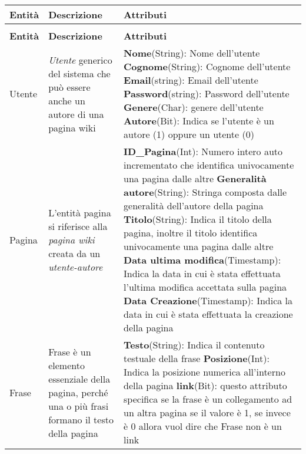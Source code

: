
\begin{longtable}{|p{2.5cm}|p{6cm}|L|}

\hline
\textbf{Entità} & \textbf{Descrizione} & \textbf{Attributi} \\
\hline

\endfirsthead
{} \\
\hline
\textbf{Entità} & \textbf{Descrizione} & \textbf{Attributi} \\
\hline
\endhead

Utente & 
\textit{Utente} generico del sistema che può 
essere anche un autore di una pagina wiki &
\textbf{Nome}(String): Nome dell'utente \newline
\textbf{Cognome}(String): Cognome dell'utente \newline
\textbf{Email}(string): Email dell'utente \newline
\textbf{Password}(string): Password dell'utente \newline
\textbf{Genere}(Char): genere dell'utente \newline
\textbf{Autore}(Bit): Indica se l'utente è un autore (1) oppure un utente (0)\\

\hline
Pagina & L'entità pagina si riferisce alla \textit{pagina wiki} creata da un \textit{utente-autore} &
\textbf{ID\_Pagina}(Int): Numero intero auto incrementato che identifica univocamente una pagina dalle altre \newline
\textbf{Generalità autore}(String): Stringa composta dalle generalità  dell'autore della pagina \newline
\textbf{Titolo}(String): Indica il titolo della pagina, inoltre il titolo identifica univocamente una pagina dalle altre \newline
\textbf{Data ultima modifica}(Timestamp): Indica la data in cui è stata effettuata l'ultima modifica accettata sulla pagina 
\textbf{Data Creazione}(Timestamp): Indica la data in cui è stata effettuata la creazione della pagina\\

\hline
Frase & Frase è un elemento essenziale della pagina, perché una o più frasi
formano il testo della pagina &
\textbf{Testo}(String): Indica il contenuto testuale della frase \newline
\textbf{Posizione}(Int): Indica la posizione numerica all'interno della pagina \newline
\textbf{link}(Bit): questo attributo specifica se la frase è un collegamento ad un altra pagina se il valore è 1, se invece è 0 allora vuol dire che Frase non è un link\\


\end{longtable}
